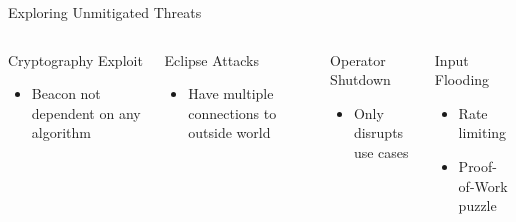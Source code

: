 \begin{frame}{Exploring Unmitigated Threats}
    \begin{columns}[T,onlytextwidth]
        \pause

        \begin{block}{Cryptography Exploit}
            \begin{itemize}

                \item Beacon not dependent on any algorithm
            \end{itemize}
        \end{block}
        \pause
        \begin{block}{Eclipse Attacks}
            \begin{itemize}
                \item Have multiple connections to outside world
            \end{itemize}
        \end{block}

        \pause
        \begin{block}{Operator Shutdown}
            \begin{itemize}
                \item Only disrupts use cases
            \end{itemize}
        \end{block}

        \pause
        \begin{block}{Input Flooding}
          \begin{itemize}
              \item Rate limiting
              \item Proof-of-Work puzzle
          \end{itemize}
        \end{block}

    \end{columns}
\end{frame}

